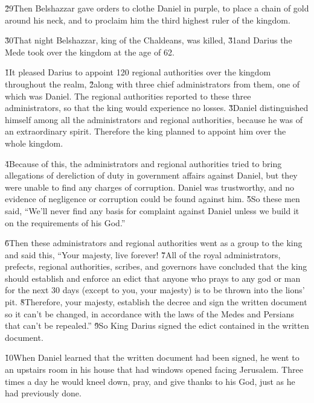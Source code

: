 \v{29}Then Belshazzar gave orders to clothe Daniel in purple, to place a chain of gold around his neck, and to proclaim him the third highest ruler of the kingdom.

\v{30}That night Belshazzar, king of the Chaldeans, was killed, \v{31}and Darius the Mede took over the kingdom at the age of 62.

\v{1}It pleased Darius to appoint 120 regional authorities over the kingdom throughout the realm, \v{2}along with three chief administrators from them, one of which was Daniel. The regional authorities reported to these three administrators, so that the king would experience no losses. \v{3}Daniel distinguished himself among all the administrators and regional authorities, because he was of an extraordinary spirit. Therefore the king planned to appoint him over the whole kingdom.

\v{4}Because of this, the administrators and regional authorities tried to bring allegations of dereliction of duty in government affairs against Daniel, but they were unable to find any charges of corruption. Daniel was trustworthy, and no evidence of negligence or corruption could be found against him. \v{5}So these men said, ``We'll never find any basis for complaint against Daniel unless we build it on the requirements of his God.''

\v{6}Then these administrators and regional authorities went as a group to the king and said this, ``Your majesty, live forever! \v{7}All of the royal administrators, prefects, regional authorities, scribes, and governors have concluded that the king should establish and enforce an edict that anyone who prays to any god or man for the next 30 days (except to you, your majesty) is to be thrown into the lions' pit. \v{8}Therefore, your majesty, establish the decree and sign the written document so it can't be changed, in accordance with the laws of the Medes and Persians that can't be repealed.'' \v{9}So King Darius signed the edict contained in the written document.

\v{10}When Daniel learned that the written document had been signed, he went to an upstairs room in his house that had windows opened facing Jerusalem. Three times a day he would kneel down, pray, and give thanks to his God, just as he had previously done.

